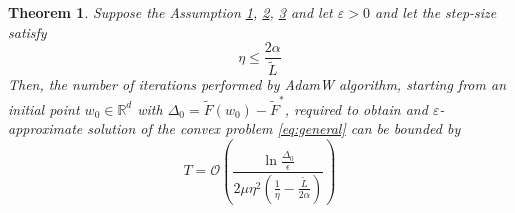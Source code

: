 \documentclass{article}
\newtheorem{theorem}{Theorem}
\begin{document}
\begin{theorem}
    Suppose the Assumption \hyperref[ass:convex]{1}, \hyperref[ass:Lsmoothness]{2}, \hyperref[ass:plcondition]{3} and let $\varepsilon > 0$ and let the step-size satisfy
    \begin{equation*}
        \eta \leq \frac{2 \alpha}{\tilde{L}}
    \end{equation*}
    Then, the number of iterations performed by AdamW algorithm, starting from an initial point $w_0 \in \mathbb{R}^d$ with $\Delta_0 = \tilde{F}(w_0) - \tilde{F}^*$, required to obtain and $\varepsilon$-approximate solution of the convex problem \eqref{eq:general} can be bounded by
    \begin{equation*}
        T =  \mathcal{O}\left( \frac{\ln \frac{\Delta_0}{\epsilon}}{2 \mu \eta^2(\frac{1}{\eta} - \frac{\tilde{L}}{2 \alpha})} \right)
    \end{equation*}
\end{theorem}
\end{document}
